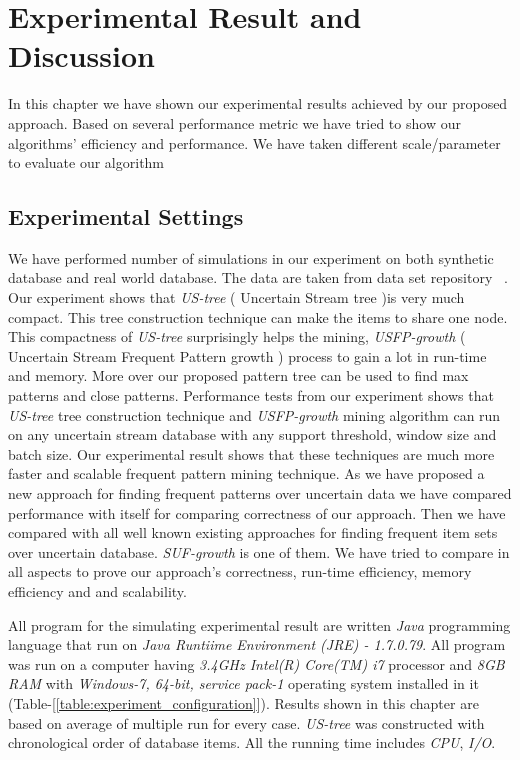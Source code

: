 %
\chapter{Experimental Result and Discussion}
In this chapter we have shown our experimental results achieved by our proposed approach. Based on several performance metric we have tried to show our algorithms' efficiency and performance. We have taken different scale/parameter to evaluate our algorithm


\section{Experimental Settings}
We have performed number of simulations in our experiment on both synthetic database and real world database. The data are taken from data set repository ~\cite{dataset}. Our experiment shows that \emph{US-tree} ( Uncertain Stream tree )is very much compact. This tree construction technique can make the items to share one node. This compactness of \emph{US-tree} surprisingly helps the mining, \emph{USFP-growth} ( Uncertain Stream Frequent Pattern growth ) process to gain a lot in run-time and memory. More over our proposed pattern tree can be used to find max patterns and close patterns. Performance tests from our experiment shows that \emph{US-tree} tree construction technique and \emph{USFP-growth} mining algorithm can run on any uncertain stream database with any support threshold, window size and batch size. Our experimental result shows that these techniques are much more faster and scalable frequent pattern mining technique. As we have proposed a new approach for finding frequent patterns over uncertain data we have compared performance with itself for comparing correctness of our approach. Then we have compared with all well known existing approaches for finding frequent item sets over uncertain database. \emph{SUF-growth} is one of them. We have tried to compare in all aspects to prove our approach's correctness, run-time efficiency, memory efficiency and and scalability.

All program for the simulating experimental result are written \emph{Java} programming language that run on \emph{Java Runtiime Environment (JRE) - 1.7.0.79}. All program was run on a computer having \emph{3.4GHz Intel(R) Core(TM) i7} processor and \emph{8GB RAM} with \emph{Windows-7, 64-bit, service pack-1} operating system installed in it (Table-[\ref{table:experiment_configuration}]). Results shown in this chapter are based on average of multiple run for every case. \emph{US-tree} was constructed with chronological order of database items. All the running time includes \emph{CPU}, \emph{I/O}.\\
